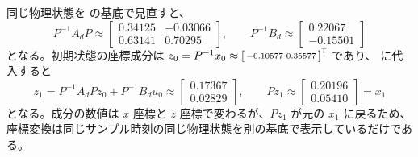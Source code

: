 同じ物理状態を  の基底で見直すと、
\begin{equation}
  P^{-1}A_dP\approx
  \begin{bmatrix}
    0.34125&-0.03066\\
    0.63141&0.70295
  \end{bmatrix},\qquad
  P^{-1}B_d\approx
  \begin{bmatrix}
    0.22067\\
    -0.15501
  \end{bmatrix}
\end{equation}
となる。初期状態の座標成分は
$z_0=P^{-1}x_0\approx
\left[\begin{smallmatrix}-0.10577&0.35577\end{smallmatrix}\right]^{\mathsf{T}}$ であり、
 に代入すると
\begin{equation}
  z_1=P^{-1}A_dPz_0+P^{-1}B_du_0\approx
  \begin{bmatrix}
    0.17367\\
    0.02829
  \end{bmatrix},\qquad
  Pz_1\approx
  \begin{bmatrix}
    0.20196\\
    0.05410
  \end{bmatrix}=x_1
\end{equation}
となる。成分の数値は $x$ 座標と $z$ 座標で変わるが、$Pz_1$ が元の $x_1$ に戻るため、
座標変換は同じサンプル時刻の同じ物理状態を別の基底で表示しているだけである。

